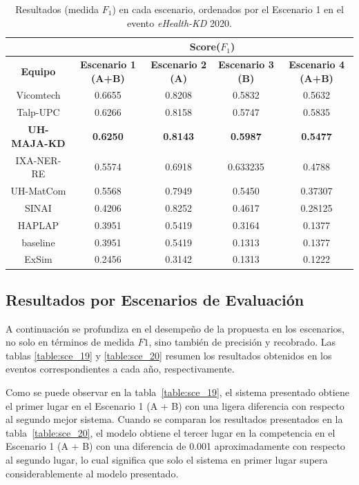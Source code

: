 \begin{table}[tb!]\centering
	\caption{Resultados (medida $F_1$) en cada escenario, ordenados por el Escenario 1 en el evento \textit{eHealth-KD} 2020. \label{table:results_19}}
	\begin{tabular}{|c|c|c|c|c|}
		\hline
		&  \multicolumn{4}{c|}{\textbf{Score($F_1$)}} \\
		\hline
		\textbf{Equipo} & \textbf{Escenario 1 (A+B)} & \textbf{Escenario 2 (A)} & \textbf{Escenario 3 (B)} &  \textbf{Escenario 4 (A+B)}\\
		\hline
		Vicomtech & 0.6655 & 0.8208 & 0.5832 & 0.5632 \\
		Talp-UPC & 0.6266 & 0.8158 & 0.5747 & 0.5835  \\
		\textbf{UH-MAJA-KD} & \textbf{0.6250} & \textbf{0.8143} & \textbf{0.5987} & \textbf{0.5477} \\
		IXA-NER-RE & 0.5574 & 0.6918 & 0.633235 & 0.4788 \\
		UH-MatCom &	0.5568 & 0.7949 & 0.5450 & 0.37307 \\
		SINAI &	0.4206 & 0.8252 & 0.4617 & 0.28125 \\
		HAPLAP & 0.3951 & 0.5419 & 0.3164 & 0.1377 \\
		baseline & 0.3951 & 0.5419 & 0.1313 & 0.1377 \\
		ExSim &	0.2456 & 0.3142 & 0.1313 & 0.1222 \\
		\hline
	\end{tabular}
\end{table}


\subsection{Resultados por Escenarios de Evaluación}

A continuación se profundiza en el desempeño de la propuesta en los escenarios, no solo en términos de medida $F1$, sino también de precisión y recobrado.
Las tablas \ref{table:sce_19} y \ref{table:sce_20} resumen los resultados obtenidos en los eventos correspondientes a cada año, respectivamente.

Como se puede observar en la tabla~\ref{table:sce_19}, el sistema presentado obtiene el primer lugar en el Escenario 1 (A + B) con una ligera diferencia con respecto al segundo mejor sistema. Cuando se comparan los resultados presentados en la tabla~\ref{table:sce_20}, el modelo obtiene el tercer lugar en la competencia en el Escenario 1 (A + B) con una diferencia de 0.001 aproximadamente con respecto al segundo lugar, lo cual significa que solo el sistema en primer lugar supera considerablemente al modelo presentado.

